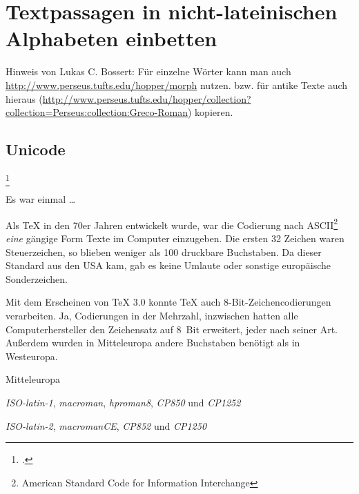 \chapter{Textpassagen in nicht-lateinischen Alphabeten einbetten}

Hinweis von Lukas C. Bossert:
Für einzelne Wörter kann man auch \url{http://www.perseus.tufts.edu/hopper/morph} nutzen.
bzw. für antike Texte auch hieraus (\url{http://www.perseus.tufts.edu/hopper/collection?collection=Perseus:collection:Greco-Roman}) kopieren.

\section{Unicode}\label{sec:unicode}
\footcite{kielhorn:dtk2014}


\noindent Es war einmal \dots

Als \TeX{} in den 70er Jahren entwickelt wurde, war die Codierung nach 
ASCII\footnote{American Standard Code for Information Interchange} \emph{eine}
gängige Form Texte im Computer einzugeben. 
Die ersten 32 Zeichen waren Steuerzeichen, so blieben weniger als 100 druckbare Buchstaben.
Da dieser Standard aus den USA kam, gab es keine Umlaute oder sonstige europäische
Sonderzeichen.

Mit dem Erscheinen von \TeX{} 3.0 konnte \TeX{} auch 8-Bit-Zeichencodierungen verarbeiten.
Ja, Codierungen in der Mehrzahl, inzwischen hatten alle Computerhersteller den Zeichensatz
auf 8~Bit erweitert, jeder nach seiner Art. Außerdem wurden in Mitteleuropa andere Buchstaben
benötigt als in Westeuropa.

\begin{labeling}{Mitteleuropa}
    \item[Westeuropa:]
      \emph{ISO-latin-1}, \emph{macroman}, \emph{hproman8}, \emph{CP850} und \emph{CP1252}
    \item[Mitteleuropa:]
      \emph{ISO-latin-2}, \emph{macromanCE}, \emph{CP852} und \emph{CP1250}
\end{labeling}

